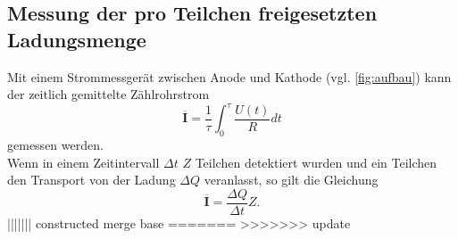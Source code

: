 \subsection{Messung der pro Teilchen freigesetzten Ladungsmenge}
\label{sec:theo:messung-freigesetzte-ladungsmenge}

Mit einem Strommessgerät zwischen Anode und Kathode (vgl. \autoref{fig:aufbau}) kann der zeitlich gemittelte
Zählrohrstrom
\begin{equation}
	\overline{\mathbf{I}} = \frac 1 \tau \int_0^\tau \frac{U(t)}{R} dt
	\label{eqn:theo:mittlerer-zaehlrohrstrom}
\end{equation}
gemessen werden.
\\
Wenn in einem Zeitintervall $\Delta t$ $Z$ Teilchen detektiert wurden und ein Teilchen den Transport von der Ladung
$\Delta Q$ veranlasst, so gilt die Gleichung
\begin{equation}
	\overline{\mathbf{I}} = \frac{\Delta Q}{\Delta t} Z.
\end{equation}
||||||| constructed merge base
=======
\cite{sample}
>>>>>>> update
